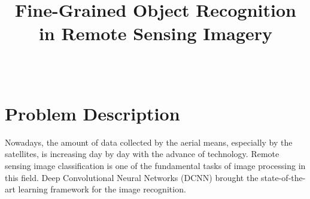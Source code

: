 \documentclass[10pt,journal,onecolumn]{IEEEtran}
\begin{document}
\markboth{\today}
{}
% 
\title{Fine-Grained Object Recognition in Remote Sensing Imagery}


\author{ \\
}

\maketitle
%



\vspace{-10mm}
\section{Problem Description}
	Nowadays, the amount of data collected by the aerial means, especially by the satellites, is increasing day by day with the advance of technology. Remote sensing image classification is one of the fundamental tasks of image processing in this field. Deep Convolutional Neural Networks (DCNN) \cite{NIPS2012_4824} brought the state-of-the-art learning framework for the image recognition.
\end{document}
